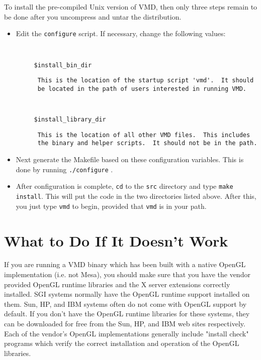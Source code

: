 \documentclass[11pt]{article}
\begin{document}
To install the pre-compiled Unix version of VMD, then
only three steps remain to be done after you uncompress
and untar the distribution. 
\begin{itemize}
\item Edit the {\tt configure} script.  If necessary, 
change the following values:
{\tt
\begin{verbatim}
     $install_bin_dir
\end{verbatim}
}
\begin{verbatim}
	  This is the location of the startup script 'vmd'.  It should
	  be located in the path of users interested in running VMD.
\end{verbatim}
{\tt
\begin {verbatim}
     $install_library_dir
\end{verbatim}
}
\begin{verbatim}
	  This is the location of all other VMD files.  This includes
	  the binary and helper scripts.  It should not be in the path.
\end{verbatim}
\item Next generate the Makefile based on these configuration
variables.  This is done by running {\tt ./configure} .
\item After configuration is complete, {\tt cd} to the {\tt src}
directory and type {\tt make install}.  This will put the code in
the two directories listed above.  After this, you just type {\tt vmd}
to begin, provided that {\tt vmd} is in your path.
\end{itemize}




\section{What to Do If It Doesn't Work}

  If you are running a VMD binary which has been built with a
native OpenGL implementation (i.e. not Mesa), you should make sure
that you have the vendor provided OpenGL runtime libraries and the
X server extensions correctly installed.  SGI systems normally have
the OpenGL runtime support installed on them.  Sun, HP, and IBM systems
often do not come with OpenGL support by default.  If you don't have the 
OpenGL runtime libraries for these systems, they can be downloaded for free
from the Sun, HP, and IBM web sites respectively.  Each of the vendor's OpenGL 
implementations generally include "install check" programs which verify
the correct installation and operation of the OpenGL libraries.
\end{document}
